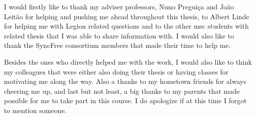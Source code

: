 \acknowledgements

I would firstly like to thank my adviser professors, Nuno Preguiça and João Leitão for helping and pushing me ahead throughout this thesis, to Albert Linde for helping me with Legion related questions and to the other msc students with related thesis that I was able to share information with. I would also like to thank the SyncFree consortium members that made their time to help me.\par
	Besides the ones who directly helped me with the work, I would also like to think my colleagues that were either also doing their thesis or having classes for motivating me along the way. Also a thanks to my hometown friends for always cheering me up, and last but not least, a big thanks to my parents that made possible for me to take part in this course. I do apologize if at this time I forgot to mention someone.

